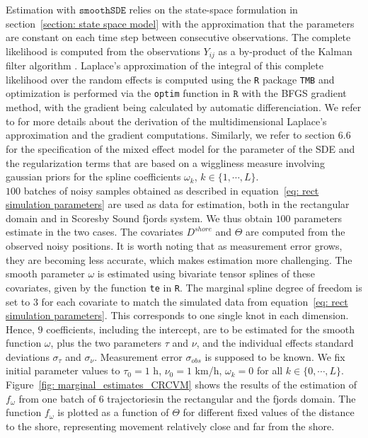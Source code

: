 \documentclass[11pt]{article}
\newcommand {\1}{\mathbb{1}}
\begin{document}
Estimation with $\texttt{smoothSDE}$ relies on the state-space formulation in section~\ref{section: state space model} with the approximation that the parameters are constant on each time step between consecutive observations.
The complete likelihood is computed from the observations $Y_{ij}$ as a by-product of the Kalman filter algorithm \cite{michelot_varying-coefficient_2021}.
Laplace's approximation of the integral of this complete likelihood over the random effects is computed using the \texttt{R} package \texttt{TMB}  and optimization is performed via the \texttt{optim} function in $\texttt{R}$ with the BFGS gradient method, with the gradient being calculated by automatic differenciation. We refer to \cite{kristensen_tmb_2016} for more details about the derivation of the multidimensional Laplace's approximation and the gradient computations. Similarly, we refer to \cite{wood_generalized_2017} section $6.6$ for the specification of the mixed effect model for the parameter of the SDE and the regularization terms that are based on a wiggliness measure involving gaussian priors for the spline coefficients $\omega_k$, $k \in \{1,\cdots,L\}$. \\

$100$ batches of noisy samples obtained as described in equation~\ref{eq: rect simulation parameters} are used as data for estimation, both in the rectangular domain and in Scoresby Sound fjords system. We thus obtain $100$ parameters estimate in the two cases. The covariates $D^{shore}$ and $\Theta$ are computed from the observed noisy positions. It is worth noting that as measurement error grows, they are becoming less accurate, which makes estimation more challenging. The smooth parameter $\omega$ is estimated using bivariate tensor splines of these covariates, given by the function \texttt{te} in \texttt{R}. The marginal spline degree of freedom is set to $3$ for each covariate to match the simulated data from equation~\ref{eq: rect simulation parameters}. This corresponds to one single knot in each dimension. Hence, $9$ coefficients, including the intercept, are to be estimated for the smooth function $\omega$, plus the two parameters $\tau$ and $\nu$, and the individual effects standard deviations $\sigma_{\tau}$ and $\sigma_{\nu}$. Measurement error $\sigma_{obs}$ is supposed to be known. 
We fix initial parameter values to $\tau_0=1$ h, $\nu_0 = 1$ km/h, $\omega_k=0$ for all $k \in \{0,\cdots,L\}$. Figure~\ref{fig: marginal_estimates_CRCVM} shows the results of the estimation of $f_{\omega}$ from one batch of $6$ trajectoriesin the rectangular and the fjords domain.
The function $f_{\omega}$  is plotted as a function of $\Theta$ for different fixed values of the distance to the shore, representing movement relatively close and far from the shore.
\end{document}
